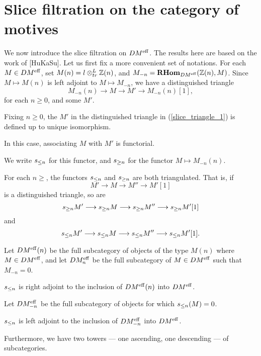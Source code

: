 \section{Slice filtration on the category of motives}

We now introduce the slice filtration on $DM^{\mathrm{eff}}$. The results here
are based on the work of [HuKaSu]. Let us first fix a more 
convenient set of notations. For each $M \in DM^{\mathrm{eff}}$, set $M(n) = 
l \otimes^{L}_{tr} \mathbb{Z}(n)$, and $M_{-n} = \mathbf{RHom}_{DM^{\mathrm{eff}}}(\mathbb{Z}(n), M)$. Since $M \mapsto
M(n)$ is left adjoint to $M \mapsto M_{-n}$, we have a 
distinguished triangle 
\begin{equation}\label{slice_triangle_1}
M_{-n}(n) \to M \to M' \to M_{-n}(n)[1],
\end{equation}
for each $n \geq 0$, and some $M'$. 

\begin{prop}
Fixing $n \geq 0$, the $M'$ in the distinguished triangle in
(\ref{slice_triangle_1}) is defined up to unique isomorphism.

In this case, associating $M$ with $M'$ is functorial.
\end{prop}

We write $s_{\leq n}$ for this functor, and $s_{\geq n}$ for the
functor $M \mapsto M_{-n}(n)$.

\begin{prop}
For each $n \geq$, the functors $s_{\leq n}$ and $s_{\geq n}$ are
both triangulated. That is, if
\[
M' \to M \to M'' \to M'[1]
\]
is a distinguished triangle, so are
\[
s_{\geq n}M' \longrightarrow s_{\geq n}M \longrightarrow s_{\geq n}M'' \longrightarrow s_{\geq n}M'[1]
\]
and
\[
s_{\leq n}M' \longrightarrow s_{\leq n}M \longrightarrow s_{\leq n}M'' \longrightarrow s_{\leq n}M'[1].
\]
\end{prop}

Let $DM^{\mathrm{eff}}(n)$ be the full subcategory of objects of the type 
$M(n)$ where $M \in DM^{\mathrm{eff}}$, and let $DM^{\mathrm{eff}}_{n}$ be the full 
subcategory of $M \in DM^{\mathrm{eff}}$ such that $M_{-n} = 0$.

\begin{prop}
$s_{\leq n}$ is right adjoint to the inclusion of $DM^{\mathrm{eff}}(n)$ into 
$DM^{\mathrm{eff}}$. 
\end{prop}

Let $DM^{\mathrm{eff}}_{-n}$ be the full subcategory of objects for which
$s_{\leq n}(M) = 0$.

\begin{prop}
$s_{\leq n}$ is left adjoint to the inclusion of $DM^{\mathrm{eff}}_{-n}$ into 
$DM^{\mathrm{eff}}$. 
\end{prop}

Furthermore, we have two towers --- one ascending, one descending 
--- of subcategories.
